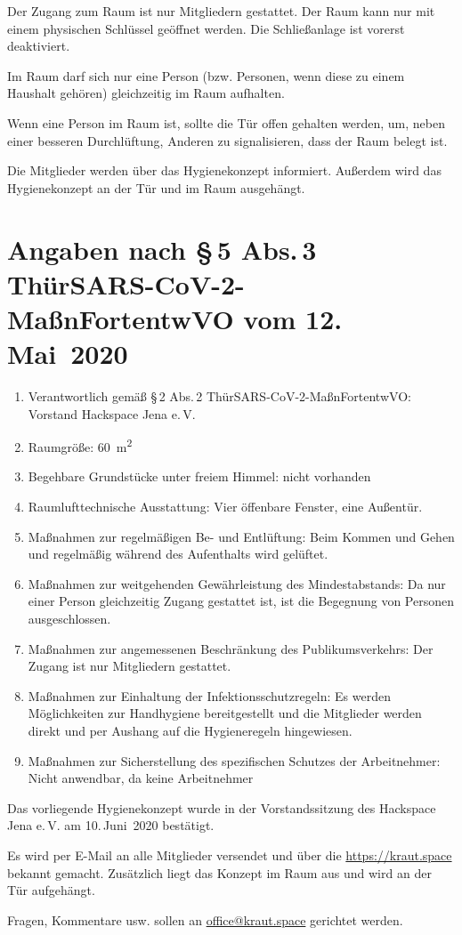 \documentclass[a4paper,12pt,parskip=half]{scrartcl}
\begin{document}
Der Zugang zum Raum ist nur Mitgliedern gestattet. Der Raum kann nur mit einem
physischen Schlüssel geöffnet werden. Die Schließanlage ist vorerst deaktiviert.

Im Raum darf sich nur eine Person (bzw. Personen, wenn diese zu einem Haushalt gehören) gleichzeitig im Raum aufhalten.

Wenn eine Person im Raum ist, sollte die Tür offen gehalten werden, um, neben einer besseren Durchlüftung, Anderen zu signalisieren, dass der Raum belegt ist. 

Die Mitglieder werden über das Hygienekonzept informiert. Außerdem wird das Hygienekonzept an der Tür und im Raum ausgehängt.

\section*{Angaben nach §\,5 Abs.\,3 ThürSARS-CoV-2-MaßnFortentwVO vom
  12.\,Mai~2020}

\begin{enumerate}
 \item Verantwortlich gemäß §\,2 Abs.\,2 ThürSARS-CoV-2-MaßnFortentwVO: Vorstand Hackspace Jena e.\,V.
 \item Raumgröße: \SI{60}{\square\metre}
 \item Begehbare Grundstücke unter freiem Himmel: nicht vorhanden
 \item Raumlufttechnische Ausstattung: Vier öffenbare Fenster, eine Außentür.
 \item Maßnahmen zur regelmäßigen Be- und Entlüftung: Beim Kommen und Gehen und regelmäßig während des Aufenthalts wird gelüftet.
 \item Maßnahmen zur weitgehenden Gewährleistung des Mindestabstands: Da nur einer Person gleichzeitig Zugang gestattet ist, ist die Begegnung von Personen ausgeschlossen.
 \item Maßnahmen zur angemessenen Beschränkung des Publikumsverkehrs: Der Zugang ist nur Mitgliedern gestattet.
 \item Maßnahmen zur Einhaltung der Infektionsschutzregeln: Es werden Möglichkeiten zur Handhygiene bereitgestellt und die Mitglieder werden direkt und per Aushang auf die Hygieneregeln hingewiesen.
 \item Maßnahmen zur Sicherstellung des spezifischen Schutzes der Arbeitnehmer: Nicht anwendbar, da keine Arbeitnehmer
\end{enumerate}

Das vorliegende Hygienekonzept wurde in der Vorstandssitzung des Hackspace Jena e.\,V. am 10.\,Juni~2020 bestätigt.

Es wird per E-Mail an alle Mitglieder versendet und über die
\href{Webseite}{https://kraut.space} bekannt gemacht. Zusätzlich liegt das Konzept im Raum aus und wird an der Tür aufgehängt.

Fragen, Kommentare usw. sollen an
\href{mailto:office@kraut.space}{office@kraut.space} gerichtet werden.

\begin{versionhistory}
\end{versionhistory}
\end{document}
